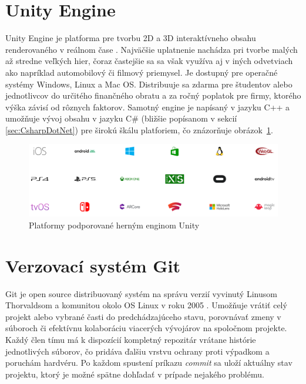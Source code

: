 \documentclass[slovak, bachelorpractice]{diploma}
\begin{document}
\section{Unity Engine}
\label{sec:Unity}
Unity Engine je platforma pre tvorbu 2D a 3D interaktívneho obsahu renderovaného v reálnom čase \cite{Unity}. Najväčšie uplatnenie nachádza pri tvorbe malých až stredne veľkých hier, čoraz častejšie sa sa však využíva aj v iných odvetviach ako napríklad automobilový či filmový priemysel. Je dostupný pre operačné systémy Windows, Linux a Mac OS. Distribuuje sa zdarma pre študentov alebo jednotlivcov do určitého finančného obratu a za ročný poplatok pre firmy, ktorého výška závisí od rôznych faktorov. Samotný engine je napísaný v jazyku C++ a umožňuje vývoj obsahu v jazyku C\# (bližšie popísanom v sekcií \ref{sec:CsharpDotNet}) pre širokú škálu platforiem, čo znázorňuje \mbox{obrázok \ref{pic:UnityPlatforms}}.

\begin{figure}[!htbp]
	\centering
	\includegraphics[width=1\textwidth]{Pictures/platforms.png}
	\caption[Platformy podporované herným enginom Unity]{Platformy podporované herným enginom Unity \cite{UnityMultiplatform}}
	\label{pic:UnityPlatforms}
\end{figure}

\section{Verzovací systém Git}
\label{sec:Git}
Git je open source distribuovaný systém na správu verzií vyvinutý Linusom Thorvaldsom a komunitou okolo OS Linux v roku 2005 \cite{ProGit}. Umožňuje vrátiť celý projekt alebo vybrané časti do predchádzajúceho stavu, porovnávať zmeny v súboroch či efektívnu kolaboráciu viacerých vývojárov na spoločnom projekte. Každý člen tímu má k dispozícií kompletný repozitár vrátane histórie jednotlivých súborov, čo pridáva ďalšiu vrstvu ochrany proti výpadkom a poruchám hardvéru. Po každom spustení príkazu \textit{commit} sa uloží aktuálny stav projektu, ktorý je možné spätne dohľadať v prípade nejakého problému.
\end{document}
